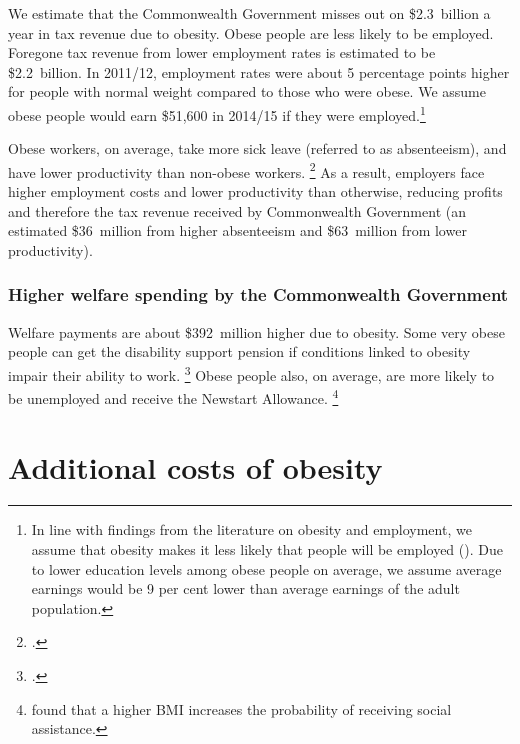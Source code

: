 \documentclass[embargoed]{grattan}
\begin{document}
We estimate that the Commonwealth Government misses out on \$2.3~billion a year in tax revenue due to obesity.
Obese people are less likely to be employed.
Foregone tax revenue from lower employment rates is estimated to be \$2.2~billion.
In 2011/12, employment rates were about 5 percentage points higher for people with normal weight compared to those who were obese.
We assume obese people would earn \$51,600 in 2014/15 if they were employed.\footnote{In line with findings from the literature on obesity and employment, we assume that obesity makes it less likely that people will be employed (\textcites{Boeckerman2016EffectWeightLabor}{Reichert2015Obesityweightloss}{Cawley2015economyscalesselective}{Rooth2009Obesityattractivenessdifferential}).
Due to lower education levels among obese people on average, we assume average earnings would be 9 per cent lower than average earnings of the adult population.}

Obese workers, on average, take more sick leave (referred to as absenteeism), and have lower productivity than non-obese workers.%
\footcites{RepresentativesStandingCommitteeonHealth2009Weighingitup}{Medibank2011SickWorkcost} As a result, employers face higher employment costs and lower productivity than otherwise, reducing profits and therefore the tax revenue received by Commonwealth Government (an estimated \$36~million from higher absenteeism and \$63~million from lower productivity).

\subsubsection{Higher welfare spending by the Commonwealth Government }\label{higher-welfare-spending-by-the-commonwealth-government}

Welfare payments are about \$392~million higher due to obesity.
Some very obese people can get the disability support pension if conditions linked to obesity impair their ability to work.%
\footcite{SocialServices2014FrequentlyAskedQuestions} Obese people also, on average, are more likely to be unemployed and receive the Newstart Allowance.%
\footnote{\textcite{Boeckerman2016EffectWeightLabor} found that a higher BMI increases the probability of receiving social assistance.}

\section{Additional costs of obesity }\label{additional-costs-of-obesity}
\end{document}
